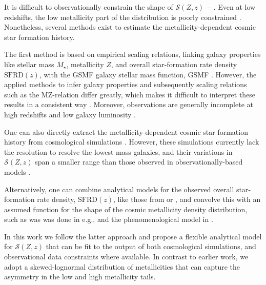 \documentclass[twocolumn]{aastex631}
\newcommand{\SFRDzZ}{\ensuremath{\mathcal{S}(Z,z)}\xspace}
\newcommand{\SFRDz}{\ensuremath{\mathrm{SFRD}(z)}\xspace}
\begin{document}
It is difficult to observationally constrain the shape of \SFRDzZ\ -- \citep[see e.g., ][for discussion of relevant observational caveats]{Chruslinska2019_obs,Boco+2021}. Even at low redshifts, the low metallicity part of the distribution is poorly constrained \citep{Chruslinska+2021}.
Nonetheless, several methods exist to estimate the metallicity-dependent cosmic star formation history. 

The first method is based on empirical scaling relations, linking galaxy properties like stellar mass $M_{\star}$, metallicity $Z$, and overall star-formation rate density \SFRDz, with the GSMF galaxy stellar mass function, GSMF \citep[see e.g.][]{Dominik+2013}. However, the applied methods to infer galaxy properties and subsequently scaling relations such as the MZ-relation differ greatly, which makes it difficult to interpret these results in a consistent way \citep[e.g.,][]{KewleyEllison2008,MaiolinoMannucci2019,Cresci+2019}. Moreover, observations are generally incomplete at high redshifts and low galaxy luminosity \citep[e.g.,][]{Chruslinska+2021}.

One can also directly extract the metallicity-dependent cosmic star formation history from cosmological simulations \citep[e.g.][]{Mapelli2017, Briel+2022_rates}. However, these simulations currently lack the resolution to resolve the lowest mass galaxies, and their variations in \SFRDzZ span a smaller range than those observed in observationally-based models \citep{Pakmor+2022}.

Alternatively, one can combine analytical models for the observed overall star-formation rate density, \SFRDz, like those from \cite{MadauDickinson2014} or \cite{Madau+2017}, and convolve this with an assumed function for the shape of the cosmic metallicity density distribution, such as was was done in e.g., \cite{LangerNorman2006} and the phenomenological model in \cite{Neijssel+2019}.

In this work we follow the latter approach and propose a flexible analytical model for \SFRDzZ that can be fit to the output of both cosmological simulations, and observational data constraints where available. 
In contrast to earlier work, we adopt a skewed-lognormal distribution of metallicities that can capture the asymmetry in the low and high metallicity tails. 
\end{document}
